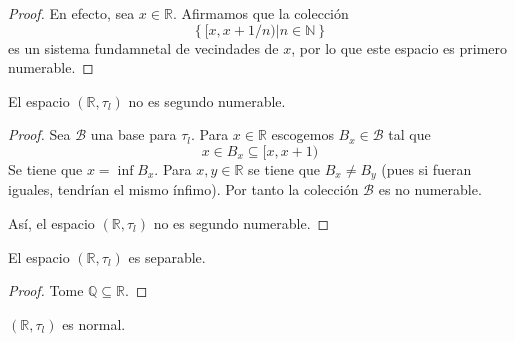 \documentclass[12pt]{report}
\theoremstyle{largebreak}
\begin{document}
    \begin{proof}
        En efecto, sea $x\in\mathbb{R}$. Afirmamos que la colección
        \begin{equation*}
            \left\{[x,x+1/n)\Big|n\in\mathbb{N} \right\}
        \end{equation*}
        es un sistema fundamnetal de vecindades de $x$, por lo que este espacio es primero numerable.
    \end{proof}

    
    \begin{exa}
        El espacio $(\mathbb{R},\tau_l)$ no es segundo numerable.
    \end{exa}

    \begin{proof}
        Sea $\mathcal{B}$ una base para $\tau_l$. Para $x\in\mathbb{R}$ escogemos $B_x\in\mathcal{B}$ tal que
        \begin{equation*}
            x\in B_x\subseteq [x,x+1)
        \end{equation*}
        Se tiene que $x=\inf B_x$. Para $x,y\in\mathbb{R}$ se tiene que $B_x\neq B_y$ (pues si fueran iguales, tendrían el mismo ínfimo). Por tanto la colección $\mathcal{B}$ es no numerable.

        Así, el espacio $(\mathbb{R},\tau_l)$ no es segundo numerable.
    \end{proof}

    \begin{exa}
        El espacio $(\mathbb{R},\tau_l)$ es separable.
    \end{exa}

    \begin{proof}
        Tome $\mathbb{Q}\subseteq\mathbb{R}$.
    \end{proof}
    
    \begin{exa}
        $(\mathbb{R},\tau_l)$ es normal.
    \end{exa}
\end{document}

